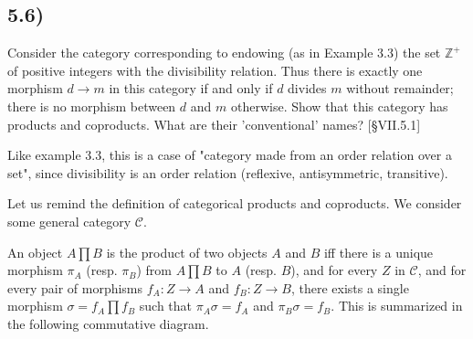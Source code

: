 \documentclass[12pt, letterpaper, twoside]{report}
\begin{document}




\subsection*{5.6)}

Consider the category corresponding to endowing (as in Example 3.3) the set $\mathbb{Z}^+$ of positive integers with the divisibility relation. Thus there is exactly one morphism $d \to m$ in this category if and only if $d$ divides $m$ without remainder; there is no morphism between $d$ and $m$ otherwise. Show that this category has products and coproducts. What are their 'conventional' names? [§VII.5.1]

Like example 3.3, this is a case of "category made from an order relation over a set", since divisibility is an order relation (reflexive, antisymmetric, transitive).

Let us remind the definition of categorical products and coproducts. We consider some general category $\mathcal{C}$.

An object $A \prod B$ is the product of two objects $A$ and $B$ iff there is a unique morphism $\pi_A$ (resp. $\pi_B$) from $A \prod B$ to $A$ (resp. $B$), and for every $Z$ in $\mathcal{C}$, and for every pair of morphisms $f_A : Z \to A$ and $f_B : Z \to B$, there exists a single morphism $\sigma = f_A \prod f_B$ such that $\pi_A \sigma = f_A$ and $\pi_B \sigma = f_B$. This is summarized in the following commutative diagram.

\end{document}

